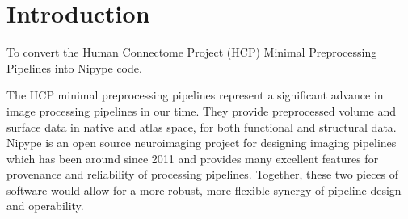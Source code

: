 \documentclass[twocolumn]{bmcart}%
\begin{document}
\begin{frontmatter}
\begin{fmbox}

	








%
\end{fmbox}%

\end{frontmatter}


\section{Introduction}\label{introduction}

To convert the Human Connectome Project (HCP) Minimal Preprocessing
Pipelines into Nipype code.

The HCP minimal preprocessing pipelines \cite{Glasser2013} represent a
significant advance in image processing pipelines in our time. They
provide preprocessed volume and surface data in native and atlas space,
for both functional and structural data. Nipype is an open source
neuroimaging project for designing imaging pipelines which has been
around since 2011 and provides many excellent features for provenance
and reliability of processing pipelines. Together, these two pieces of
software would allow for a more robust, more flexible synergy of
pipeline design and operability.
\end{document}
